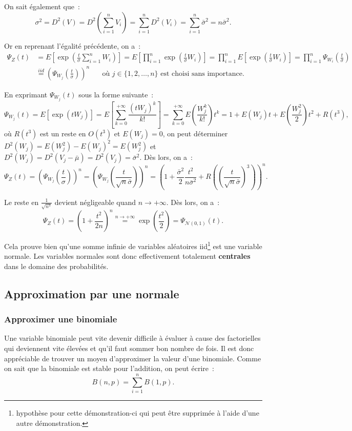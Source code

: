 \documentclass{article}
\newcommand{\Nzo}{\mathcal N(0, 1)}
\begin{document}
		On sait également que~:
		\[\sigma^2 = D^2(V) = D^2\left(\sum_{i=1}^nV_i\right) = \sum_{i=1}^nD^2(V_i) = \sum_{i=1}^n\bar\sigma^2 = n\bar\sigma^2.\]

		Or en reprenant l'égalité précédente, on a~:
		\begin{align*}
			\Psi_Z(t) &= E\left[ \exp\left(\frac t\sigma \sum_{i=1}^nW_i\right) \right] = E\left[ \prod_{i=1}^n\exp\left(\frac t\sigma W_i\right) \right]
				= \prod_{i=1}^nE\left[ \exp\left(\frac t\sigma W_i\right) \right] = \prod_{i=1}^n\Psi_{W_i}\left(\frac t\sigma\right) \\
		    &\stackrel{iid}= \left(\Psi_{W_j}\left(\frac t\sigma\right)\right)^n \;\;\;\;\;\text{ où $j \in \{1, 2, \ldots, n\}$ est choisi sans importance}.
		\end{align*}

		En exprimant $\Psi_{W_j}(t)$ sous la forme suivante~:
		\[\Psi_{W_j}(t) = E[\exp(tW_j)] = E\left[\sum_{k=0}^{+\infty}\frac {(tW_j)^k}{k!}\right]
			= \sum_{k=0}^{+\infty}E\left(\frac {W_j^k}{k!}\right)t^k = 1 + E(W_j)t + E\left(\frac {W_j^2}2\right)t^2 + R(t^3),\]
		où $R(t^3)$ est un reste en $O(t^3)$ et $E(W_j) = 0$, on peut déterminer $D^2(W_j) = E(W_j^2) - E(W_j)^2 = E(W_j^2)$ et
		$D^2(W_j) = D^2(V_j - \bar\mu) = D^2(V_j) = \bar{\sigma}^2$. Dès lors, on a~:
		\[\Psi_Z(t) = \left(\Psi_{W_j}\left(\frac t\sigma\right)\right)^n = \left(\Psi_{W_j}\left(\frac t{\sqrt n\bar\sigma}\right)\right)^n
			= \left( 1 + \frac {\bar{\sigma}^2}2\frac {t^2}{n\bar{\sigma}^2} + R\left(\left(\frac t{\sqrt n\bar\sigma}\right)^3\right)\right)^n.\]

		Le reste en $\frac 1{\sqrt {n^3}}$ devient négligeable quand $n \to +\infty$. Dès lors, on a~:
		\[\Psi_Z(t) = \left(1 + \frac {t^2}{2n}\right)^n \stackrel{n\to+\infty}=\exp\left(\frac {t^2}2\right) = \Psi_{\Nzo}(t).\]

		Cela prouve bien qu'une somme infinie de variables aléatoires iid\footnote{hypothèse pour cette démonstration-ci qui peut être supprimée à l'aide d'une autre
		démonstration.} est une variable normale. Les variables normales sont donc effectivement totalement \textbf{centrales} dans le domaine des probabilités.

	\subsection{Approximation par une normale}
		\subsubsection{Approximer une binomiale}
			Une variable binomiale peut vite devenir difficile à évaluer à cause des factorielles qui deviennent vite élevées et qu'il faut sommer bon nombre de fois. Il
			est donc appréciable de trouver un moyen d'approximer la valeur d'une binomiale. Comme on sait que la binomiale est stable pour l'addition, on peut écrire~:
			\[B(n, p) = \sum_{i=1}^nB(1, p).\]
\end{document}
